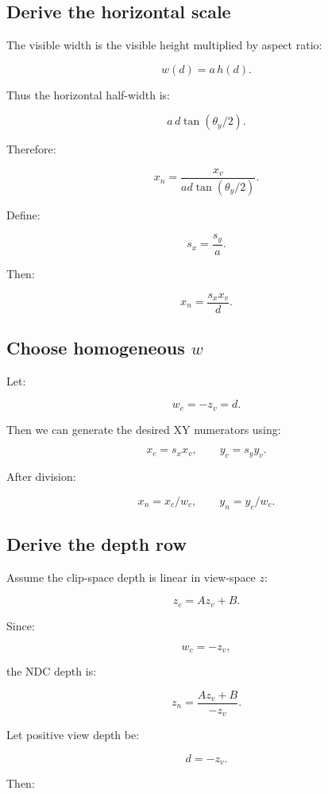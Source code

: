 \subsection{Derive the horizontal scale}\label{02-foundations-ii-ch033-derive-the-horizontal-scale}

The visible width is the visible height multiplied by aspect ratio:

\[
 w(d)=a\,h(d).
\]

Thus the horizontal half-width is:

\[
 a\,d\tan(\theta_y/2).
\]

Therefore:

\[
 \boxed{ x_n= \frac{x_v}{ad\tan(\theta_y/2)} }.
\]

Define:

\[
 \boxed{ s_x=\frac{s_y}{a} }.
\]

Then:

\[
 \boxed{ x_n=\frac{s_xx_v}{d} }.
\]

\subsection{\texorpdfstring{Choose homogeneous \(w\)}{Choose homogeneous w}}\label{02-foundations-ii-ch033-choose-homogeneous-w}

Let:

\[
 \boxed{ w_c=-z_v=d }.
\]

Then we can generate the desired XY numerators using:

\[
 x_c=s_xx_v, \qquad y_c=s_yy_v.
\]

After division:

\[
 x_n=x_c/w_c, \qquad y_n=y_c/w_c.
\]

\subsection{Derive the depth row}\label{02-foundations-ii-ch033-derive-the-depth-row}

Assume the clip-space depth is linear in view-space \(z\):

\[
 \boxed{ z_c=Az_v+B }.
\]

Since:

\[
 w_c=-z_v,
\]

the NDC depth is:

\[
 z_n= \frac{Az_v+B}{-z_v}.
\]

Let positive view depth be:

\[
 d=-z_v.
\]

Then:

